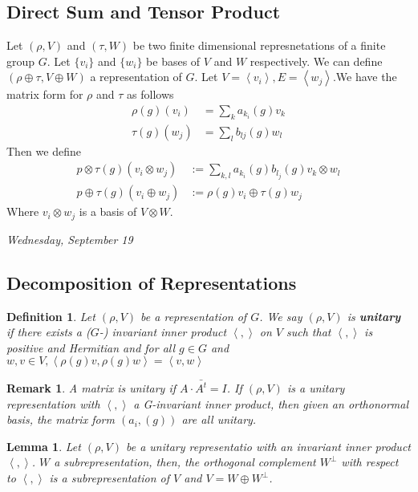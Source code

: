 \documentclass[letterpaper, leqno, 12pt]{article}
\newcommand{\fin}{\qquad \quad \hfill \framebox[1.75mm][l]{\,}}
\providecommand{\ip}[1]{\left\langle #1 \right\rangle}
\newcommand {\repV} {(\rho,V)}
\newcommand {\repW} {(\tau,W)}
\theoremstyle{stdthm}
\newtheorem{lem}[thm]{Lemma}
\theoremstyle{stddef}
\newtheorem{defn}[thm]{Definition}
\newtheorem{rem}[thm]{Remark} %
\theoremstyle{stdnonum}
\theoremstyle{stdqands}
\theoremstyle{stdbold}
\begin{document}
\subsection{Direct Sum and Tensor Product}
Let $\repV$ and $\repW$ be two finite dimensional represnetations of a finite group $G$. Let $\{v_i\}$ and $\{w_i\}$ be bases of $V$ and $W$ respectively. We can define $(\rho \oplus \tau, V\oplus W)$ a representation of $G$. Let $V = \ip{v_i}, E = \ip{w_j}$.We have the matrix form for $\rho$ and $\tau$ as follows 
\begin{align*}
\rho(g)(v_i) &= \sum_k a_{k_i}(g)v_k\\
\tau(g)(w_j) &= \sum_l b_{lj}(g) w_l
\end{align*}
Then we define
\begin{align*}
p \otimes \tau (g)  (v_i \otimes w_j) &:= \sum_{k,l} a_{k_i}(g)b_{l_j}(g) v_k \otimes w_l \\
p \oplus \tau(g) (v_i \oplus w_j) &:= \rho(g) v_i \oplus \tau(g) w_j
\end{align*}
Where $v_i \otimes w_j$ is a basis of $V \otimes W$. 


\begin{center}
\emph{Wednesday, September 19}
\end{center}

\subsection{Decomposition of Representations}

\begin{defn}
Let $\repV$ be a representation of $G$. We say $\repV$ is {\bf unitary} if there exists a ($G$-) invariant inner product $\ip{,}$ on $V$ such that $\ip{,}$ is positive and Hermitian and for all $g\in G$ and $w,v \in V, \ip{\rho(g)v, \rho(g)w} = \ip{v,w}$
\end{defn}

\begin{rem}
A matrix is unitary if $A\cdot \bar{A^t} = I$.  If $\repV$ is a unitary representation with $\ip{,}$ a G-invariant inner product, then given an orthonormal basis, the matrix form $(a_i, (g))$ are all unitary.  
\end{rem}

\begin{lem}
Let $\repV$ be a unitary representatio with an invariant inner product $\ip{,}$. $W$ a subrepresentation, then, the orthogonal complement $W^{\perp}$ with respect to $\ip{,}$ is a subrepresentation of $V$ and $V = W \oplus W^{\perp}$.  
\end{lem}
\end{document}
